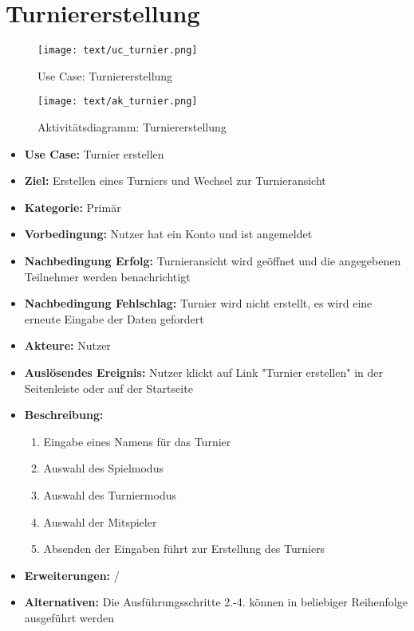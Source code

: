 \section{Turniererstellung}
\begin{figure}[h!]
	\centering
	\texttt{[image: text/uc\_turnier.png]}
	\caption{Use Case: Turniererstellung}
	\label{uc_turnier}
\end{figure}
\begin{figure}[h!]
	\centering
	\texttt{[image: text/ak\_turnier.png]}
	\caption{Aktivitätsdiagramm: Turniererstellung}
	\label{ak_turnier}
\end{figure}
\begin{itemize}
	\item \textbf{Use Case:} Turnier erstellen
	\item \textbf{Ziel:} Erstellen eines Turniers und Wechsel zur Turnieransicht
	\item \textbf{Kategorie:} Primär
	\item \textbf{Vorbedingung:} Nutzer hat ein Konto und ist angemeldet
	\item \textbf{Nachbedingung Erfolg:} Turnieransicht wird geöffnet und die angegebenen Teilnehmer werden benachrichtigt
	\item \textbf{Nachbedingung Fehlschlag:} Turnier wird nicht erstellt, es wird eine erneute Eingabe der Daten gefordert
	\item \textbf{Akteure:} Nutzer
	\item \textbf{Auslösendes Ereignis:} Nutzer klickt auf Link "Turnier erstellen" in der Seitenleiste oder auf der Startseite
	\item \textbf{Beschreibung:} \begin{enumerate}
		\item Eingabe eines Namens für das Turnier
		\item Auswahl des Spielmodus
		\item Auswahl des Turniermodus
		\item Auswahl der Mitspieler
		\item Absenden der Eingaben führt zur Erstellung des Turniers
	\end{enumerate}
	\item \textbf{Erweiterungen:} /
	\item \textbf{Alternativen:} Die Ausführungsschritte 2.-4. können in beliebiger Reihenfolge ausgeführt werden
\end{itemize}

